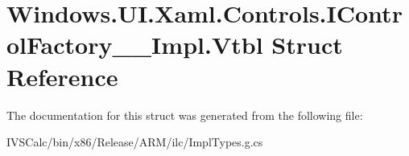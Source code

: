 \hypertarget{struct_windows_1_1_u_i_1_1_xaml_1_1_controls_1_1_i_control_factory_____impl_1_1_vtbl}{}\section{Windows.\+U\+I.\+Xaml.\+Controls.\+I\+Control\+Factory\+\_\+\+\_\+\+Impl.\+Vtbl Struct Reference}
\label{struct_windows_1_1_u_i_1_1_xaml_1_1_controls_1_1_i_control_factory_____impl_1_1_vtbl}


The documentation for this struct was generated from the following file\+:\begin{DoxyCompactItemize}
\item 
I\+V\+S\+Calc/bin/x86/\+Release/\+A\+R\+M/ilc/Impl\+Types.\+g.\+cs\end{DoxyCompactItemize}
